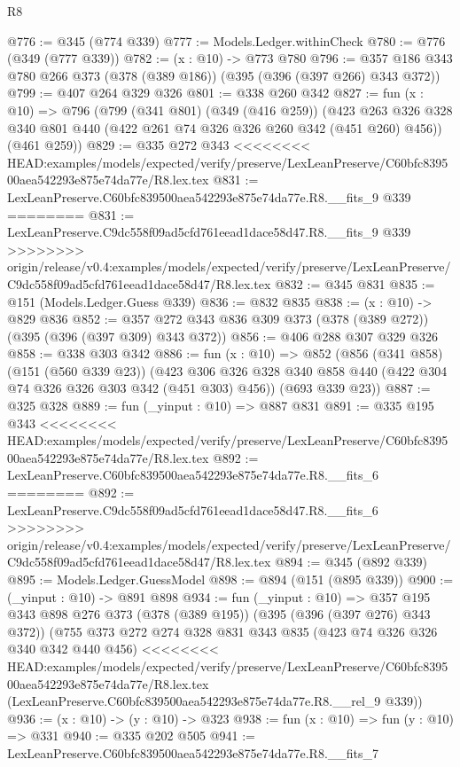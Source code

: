\begin{lexlean}{R8}
\begin{coremodule}
{{{{{{{{{{{{{{{{{{{{{{{@776 := @345 (@774 @339)
@777 := Models.Ledger.withinCheck
@780 := @776 (@349 (@777 @339))
@782 := (x : @10) -> @773 @780
@796 := @357 @186 @343 @780 @266 @373 (@378 (@389 @186)) (@395 (@396 (@397 @266) @343 @372))
@799 := @407 @264 @329 @326
@801 := @338 @260 @342
@827 := fun (x : @10) =>
  @796
    (@799
      (@341 @801)
      (@349 (@416 @259))
      (@423 @263 @326 @328 @340 @801 @440 (@422 @261 @74 @326 @326 @260 @342 (@451 @260) @456))
      (@461 @259))
@829 := @335 @272 @343
<<<<<<<< HEAD:examples/models/expected/verify/preserve/LexLeanPreserve/C60bfc839500aea542293e875e74da77e/R8.lex.tex
@831 := LexLeanPreserve.C60bfc839500aea542293e875e74da77e.R8.__fits_9 @339
========
@831 := LexLeanPreserve.C9dc558f09ad5cfd761eead1dace58d47.R8.__fits_9 @339
>>>>>>>> origin/release/v0.4:examples/models/expected/verify/preserve/LexLeanPreserve/C9dc558f09ad5cfd761eead1dace58d47/R8.lex.tex
@832 := @345 @831
@835 := @151 (Models.Ledger.Guess @339)
@836 := @832 @835
@838 := (x : @10) -> @829 @836
@852 := @357 @272 @343 @836 @309 @373 (@378 (@389 @272)) (@395 (@396 (@397 @309) @343 @372))
@856 := @406 @288 @307 @329 @326
@858 := @338 @303 @342
@886 := fun (x : @10) =>
  @852
    (@856
      (@341 @858)
      (@151 (@560 @339 @23))
      (@423 @306 @326 @328 @340 @858 @440 (@422 @304 @74 @326 @326 @303 @342 (@451 @303) @456))
      (@693 @339 @23))
@887 := @325 @328
@889 := fun (_yinput : @10) => @887 @831
@891 := @335 @195 @343
<<<<<<<< HEAD:examples/models/expected/verify/preserve/LexLeanPreserve/C60bfc839500aea542293e875e74da77e/R8.lex.tex
@892 := LexLeanPreserve.C60bfc839500aea542293e875e74da77e.R8.__fits_6
========
@892 := LexLeanPreserve.C9dc558f09ad5cfd761eead1dace58d47.R8.__fits_6
>>>>>>>> origin/release/v0.4:examples/models/expected/verify/preserve/LexLeanPreserve/C9dc558f09ad5cfd761eead1dace58d47/R8.lex.tex
@894 := @345 (@892 @339)
@895 := Models.Ledger.GuessModel
@898 := @894 (@151 (@895 @339))
@900 := (_yinput : @10) -> @891 @898
@934 := fun (_yinput : @10) =>
  @357
    @195
    @343
    @898
    @276
    @373
    (@378 (@389 @195))
    (@395 (@396 (@397 @276) @343 @372))
    (@755
      @373
      @272
      @274
      @328
      @831
      @343
      @835
      (@423 @74 @326 @326 @340 @342 @440 @456)
<<<<<<<< HEAD:examples/models/expected/verify/preserve/LexLeanPreserve/C60bfc839500aea542293e875e74da77e/R8.lex.tex
      (LexLeanPreserve.C60bfc839500aea542293e875e74da77e.R8.__rel_9 @339))
@936 := (x : @10) -> (y : @10) -> @323
@938 := fun (x : @10) => fun (y : @10) => @331
@940 := @335 @202 @505
@941 := LexLeanPreserve.C60bfc839500aea542293e875e74da77e.R8.__fits_7
}}}}}}}}}}}}}}}}}}}}}}}
\end{coremodule}
\end{lexlean}
